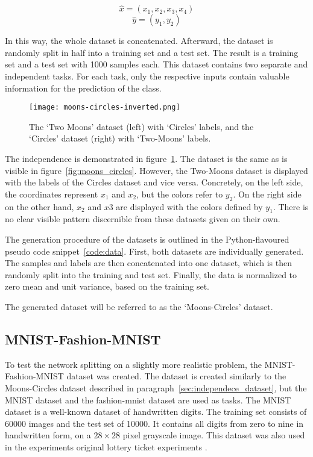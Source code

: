 \[\hat x = ( x_1 , x_2 , x_3 , x_4 )\]
\[\hat y = ( y_1 , y_2 )\]

In this way, the whole dataset is concatenated.
Afterward, the dataset is randomly split in half into a training set and a test set.
The result is a training set and a test set with 1000 samples each.
This dataset contains two separate and independent tasks.
For each task, only the respective inputs contain valuable information for the prediction of the class.

\begin{figure}[ht]
    \centering
    \texttt{[image: moons-circles-inverted.png]}
    \caption{
        The `Two Moons' dataset (left) with `Circles' labels, and the `Circles' dataset (right) with `Two-Moons' labels. 
    }\label{fig:moons_circles_inverted}
\end{figure}

The independence is demonstrated in figure~\ref{fig:moons_circles_inverted}.
The dataset is the same as is visible in figure~\ref{fig:moons_circles}. 
However, the Two-Moons dataset is displayed with the labels of the Circles dataset and vice versa.
Concretely, on the left side, the coordinates represent $x_1$ and $x_2$, but the colors refer to $y_2$.
On the right side on the other hand, $x_2$ and $x3$ are displayed with the colors defined by $y_1$.
There is no clear visible pattern discernible from these datasets given on their own.

The generation procedure of the datasets is outlined in the Python-flavoured pseudo code snippet~\ref{code:data}.
First, both datasets are individually generated.
The samples and labels are then concatenated into one dataset, which is then randomly split into the training and test set.
Finally, the data is normalized to zero mean and unit variance, based on the training set.

The generated dataset will be referred to as the `Moons-Circles' dataset.

\subsection{MNIST-Fashion-MNIST}\label{sec:mnist}
To test the network splitting on a slightly more realistic problem, the MNIST-Fashion-MNIST dataset was created.
The dataset is created similarly to the Moons-Circles dataset described in paragraph~\ref{sec:independece_dataset}, but the MNIST dataset \autocite{mnist} and the fashion-mnist \autocite{fashion} dataset are used as tasks.
The MNIST dataset is a well-known dataset of handwritten digits. 
The training set consists of 60000 images and the test set of 10000.
It contains all digits from zero to nine in handwritten form, on a $28 \times 28$ pixel grayscale image.
This dataset was also used in the experiments original lottery ticket experiments \autocite{LTH}.

